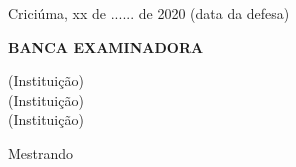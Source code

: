 \begin{folhadeaprovacao}

  \begin{center}
  \vspace*{-1.2cm}
    {\large\imprimirautor}

    \vspace*{\fill}
    {\large\imprimirtitulo}
    \vspace*{\fill}
    
    \hspace{.45\textwidth}
    \begin{minipage}{\textwidth}
    \vspace*{-7.cm}
        \imprimirpreambuloaprovacao
    \end{minipage}%
    \vspace*{\fill}
   \end{center}
    
  \begin{center}
  \vspace*{-5.cm}
  	 Criciúma, xx de ...... de 2020 (data da defesa)
  \end{center}
  \begin{center}
  \textbf{BANCA EXAMINADORA}
  \end{center}
  
  \begin{center}
  \vspace*{1.5cm}
   {\imprimirorientador     (Instituição) \\

    \vspace*{.5cm}
   \imprimircoorientador    (Instituição) \\

    \vspace*{.5cm}
   \imprimirbanca          (Instituição) \\


    }
    \end{center}
    
   \begin{center}
    \vspace*{3cm}
    {\large\imprimirautor}
    \par
    Mestrando
  \end{center}
  
\end{folhadeaprovacao}